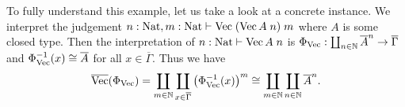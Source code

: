 \documentclass[runningheads,envcountsame,envcountsect,orivec]{llncs}
\begin{document}
\begin{example}
  To fully understand this example, let us take a look at a concrete instance.
  We interpret the judgement
  $n : \operatorname{Nat}, m : \operatorname{Nat} \vdash \operatorname{Vec} \; (\operatorname{Vec} A \; n) \; m$ where $A$ is some
  closed type.
  Then the interpretation of $n : \operatorname{Nat} \vdash \operatorname{Vec} A \; n$ is
  $\Phi_{\operatorname{Vec}} : \coprod_{n \in \mathbb{N}} \overline{A}^n \to \overline{\Gamma}$
  and $\Phi_{\operatorname{Vec}}^{-1}(x) \cong \overline{A}$ for all
  $x \in \overline{\Gamma}$.
  Thus we have
  \begin{equation*}
    \overline{\operatorname{Vec}}(\Phi_{\operatorname{Vec}}) =
      \coprod_{m \in \mathbb{N}}
      \coprod_{x \in \overline{\Gamma}}
      \left(\Phi_{\operatorname{Vec}}^{-1}(x) \right)^m
      \cong
      \coprod_{m \in \mathbb{N}} \coprod_{n \in \mathbb{N}} \overline{A}^n.
  \end{equation*}
\end{example}


%
%
\end{document}
